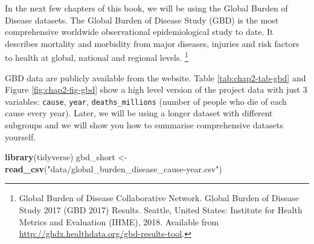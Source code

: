 \documentclass[
  12pt,
  krantz2]{krantz}
\makeatletter
\newenvironment{Shaded}{\begin{snugshade}}{\end{snugshade}}
\newcommand{\KeywordTok}[1]{\textcolor[rgb]{0.13,0.29,0.53}{\textbf{#1}}}
\newcommand{\NormalTok}[1]{#1}
\newcommand{\StringTok}[1]{\textcolor[rgb]{0.31,0.60,0.02}{#1}}
\newenvironment{kframe}{%
\medskip{}
\setlength{\fboxsep}{.8em}
 \def\at@end@of@kframe{}%
 \ifinner\ifhmode%
  \def\at@end@of@kframe{\end{minipage}}%
  \begin{minipage}{\columnwidth}%
 \fi\fi%
 \def\FrameCommand##1{\hskip\@totalleftmargin \hskip-\fboxsep
 \colorbox{shadecolor}{##1}\hskip-\fboxsep
     \hskip-\linewidth \hskip-\@totalleftmargin \hskip\columnwidth}%
 \MakeFramed {\advance\hsize-\width
   \@totalleftmargin\z@ \linewidth\hsize
   \@setminipage}}%
 {\par\unskip\endMakeFramed%
 \at@end@of@kframe}
\renewenvironment{Shaded}{\begin{kframe}}{\end{kframe}}
\makeatother
\begin{document}
In the next few chapters of this book, we will be using the Global Burden of Disease datasets.
The Global Burden of Disease Study (GBD) is the most comprehensive worldwide observational epidemiological study to date.
It describes mortality and morbidity from major diseases, injuries and risk factors to health at global, national and regional levels.
\footnote{Global Burden of Disease Collaborative Network.
  Global Burden of Disease Study 2017 (GBD 2017) Results.
  Seattle, United States: Institute for Health Metrics and Evaluation (IHME), 2018.
  Available from \url{http://ghdx.healthdata.org/gbd-results-tool}.}

GBD data are publicly available from the website.
Table \ref{tab:chap2-tab-gbd} and Figure \ref{fig:chap2-fig-gbd} show a high level version of the project data with just 3 variables: \texttt{cause}, \texttt{year}, \texttt{deaths\_millions} (number of people who die of each cause every year).
Later, we will be using a longer dataset with different subgroups and we will show you how to summarise comprehensive datasets yourself.

\begin{Shaded}
\begin{Highlighting}[]
\KeywordTok{library}\NormalTok{(tidyverse)}
\NormalTok{gbd_short <-}\StringTok{ }\KeywordTok{read_csv}\NormalTok{(}\StringTok{"data/global_burden_disease_cause-year.csv"}\NormalTok{)}
\end{Highlighting}
\end{Shaded}
\end{document}
